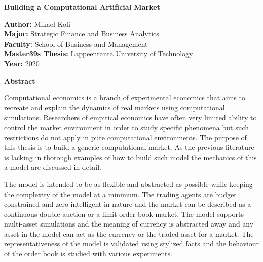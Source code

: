 \thispagestyle{plain}
\begin{center}
    \Large
    \textbf{Building a Computational Artificial Market}
        
    \vspace{0.4cm}
    \large
        
    \vspace{0.4cm}
    
    \begin{flushleft}
        \textbf{Author:} Mikael Koli \\
        \textbf{Major:} Strategic Finance and Business Analytics \\
        \textbf{Faculty:} School of Business and Management \\
        \textbf{Master\char39s Thesis:} Lappeenranta University of Technology \\
        \textbf{Year:} 2020
    \end{flushleft}
        
    \vspace{0.9cm}
    \textbf{Abstract}
\end{center}

Computational economics is a branch of experimental economics that aims to 
recreate and explain the dynamics of real markets using computational simulations. Researchers of
empirical economics have often very limited ability to control the market environment 
in order to study specific phenomena but such restrictions do not apply in pure computational
environments. The purpose of this thesis is to build a generic computational market. As the
previous literature is lacking in thorough examples of how to build such model the mechanics of this
a model are discussed in detail. 

The model is intended to be as flexible and abstracted as possible 
while keeping the complexity of the model at a minimum. The trading agents are budget constrained 
and zero-intelligent in nature and the market can be described as a continuous double auction or a 
limit order book market. The model supports multi-asset simulations and the meaning of currency is 
abstracted away and any asset in the model can act as the currency or the traded asset for a market. 
The representativeness of the model is validated using stylized facts and the behaviour
of the order book is studied with various experiments.

